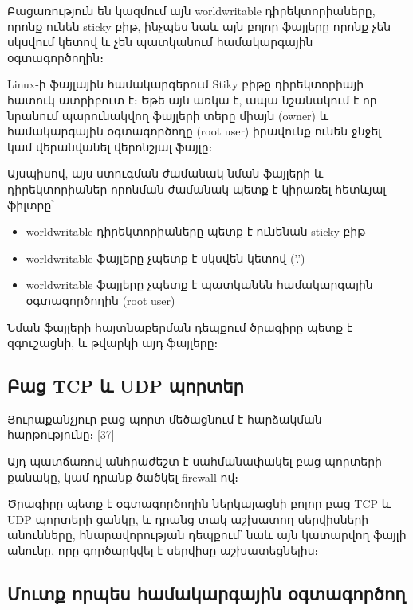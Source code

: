 \documentclass[a4paper,12pt]{article}
\begin{document}
\begin{sloppypar}
Բացառություն են կազմում այն worldwritable դիրեկտորիաները, որոնք ունեն
sticky բիթ, ինչպես նաև այն բոլոր ֆայլերը որոնք չեն սկսվում կետով և չեն
պատկանում համակարգային օգտագործողին։

Linux-ի ֆայլային համակարգերում Stiky բիթը դիրեկտորիայի հատուկ ատրիբուտ է։
Եթե այն առկա է, ապա նշանակում է որ նրանում պարունակվող ֆայլերի տերը միայն (owner)
և համակարգային օգտագործողը (root user) իրավունք ունեն ջնջել կամ վերանվանել
վերոնշյալ ֆայլը։

Այսպիսով, այս ստուգման ժամանակ նման ֆայլերի և դիրեկտորիաներ որոնման ժամանակ
պետք է կիրառել հետևյալ ֆիլտրը՝

\begin{itemize}
\item worldwritable դիրեկտորիաները պետք է ունենան sticky բիթ
\item worldwritable ֆայլերը չպետք է սկսվեն կետով ('.')
\item worldwritable ֆայլերը չպետք է պատկանեն համակարգային օգտագործողին
	(root user)
\end{itemize}

Նման ֆայլերի հայտնաբերման դեպքում ծրագիրը պետք է զգուշացնի,
և թվարկի այդ ֆայլերը։


\subsection{Բաց TCP և UDP պորտեր}


Յուրաքանչյուր բաց պորտ մեծացնում է հարձակման հարթությունը։ [37]

Այդ պատճառով անհրաժեշտ է սահմանափակել բաց պորտերի քանակը,
կամ դրանք ծածկել firewall-ով։

Ծրագիրը պետք է օգտագործողին ներկայացնի բոլոր բաց 
TCP և UDP պորտերի ցանկը, և դրանց տակ աշխատող սերվիսների
անունները, հնարավորության դեպքում՝ նաև այն կատարվող
ֆայլի անունը, որը գործարկվել է սերվիսը աշխատեցնելիս։


\subsection{Մուտք որպես համակարգային օգտագործող}



\end{sloppypar}
\end{document}

